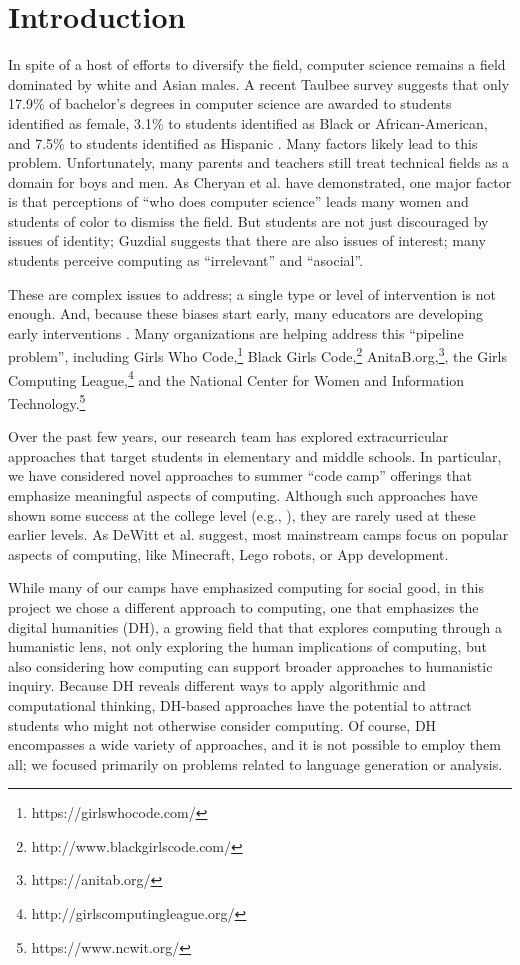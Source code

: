 \section{Introduction}

In spite of a host of efforts to diversify the field, computer
science remains a field dominated by white and Asian males.  A
recent Taulbee survey \cite{Taulbee2016} suggests that only 17.9\%
of bachelor's degrees in computer science are awarded to students
identified as female, 3.1\% to students identified as Black or
African-American, and 7.5\% to students identified as Hispanic
\cite{Taulbee2016}.  Many factors likely lead to this
problem.  Unfortunately, many parents and teachers still treat
technical fields as a domain for boys and men.  As Cheryan et al.
\cite{Cheryan2010} have demonstrated, one major factor is that
perceptions of ``who does computer science'' leads many women and
students of color to dismiss the field.  But students are not
just discouraged by issues of identity; Guzdial \cite{Guzdial2009}
suggests that there are also issues of interest; many students
perceive computing as ``irrelevant'' and ``asocial''.

These are complex issues to address; a single type or level of
intervention is not enough.  And, because these biases start early,
many educators are developing early interventions
\cite{McGill2015,Decker2016}.  Many organizations are helping address
this ``pipeline problem'', including Girls Who
Code,\footnote{https://girlswhocode.com/} Black Girls
Code,\footnote{http://www.blackgirlscode.com/}
AnitaB.org,\footnote{https://anitab.org/}, the Girls Computing
League,\footnote{http://girlscomputingleague.org/} and the National
Center for Women and Information
Technology.\footnote{https://www.ncwit.org/}

Over the past few years, our research team has explored extracurricular
approaches that target students in elementary and middle schools.
In particular, we have considered novel approaches to summer ``code
camp'' offerings that emphasize meaningful aspects of computing.
Although such approaches have shown some success at the college
level (e.g., \cite{Goldweber2013, Goldweber2018}), they are rarely
used at these earlier levels.  As DeWitt et al. \cite{DeWitt2017}
suggest, most mainstream camps focus on popular aspects of computing,
like Minecraft, Lego robots, or App development.

While many of our camps have emphasized computing for social good,
in this project we chose a different approach to computing, one
that emphasizes the digital humanities (DH), a growing field that
that explores computing through a humanistic lens, not only exploring
the human implications of computing, but also considering how
computing can support broader approaches to humanistic inquiry.
Because DH reveals different ways to apply algorithmic and computational
thinking, DH-based approaches have the potential to attract students
who might not otherwise consider computing.  Of course, DH encompasses
a wide variety of approaches, and it is not possible to employ them
all; we focused primarily on problems related to language generation
or analysis.

